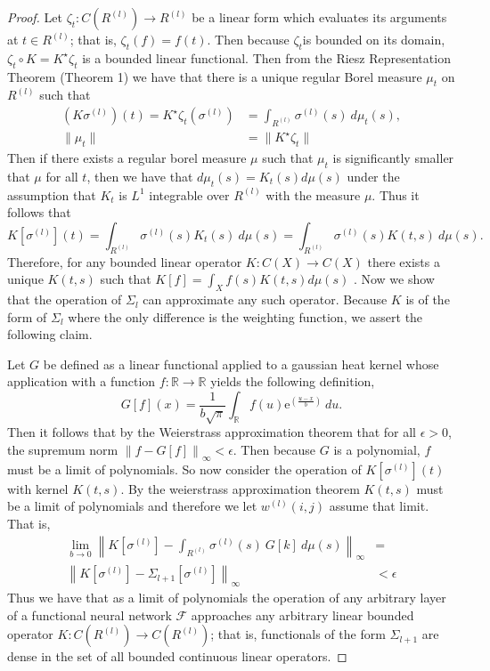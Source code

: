 \documentclass{ib-assignment}
\begin{document}
\begin{proof} Let $\zeta_t :C(R^{(l)})\to R^{(l)}$ be a linear form which evaluates its arguments at $t\in R^{(l)}$; that is, $\zeta_t(f) = f(t)$.  Then because $\zeta_t$is bounded on its domain, $\zeta_t\circ K = K^\star\zeta_t$ is a bounded linear functional. Then from the Riesz Representation Theorem (Theorem 1) we have that there is a unique regular Borel measure $\mu_t$ on $R^{(l)}$ such that 
\begin{equation*}
\begin{aligned}
    \left(K\sigma^{(l)}\right)(t) = K^\star \zeta_t\left(\sigma^{(l)}\right) &= \int_{R^{(l)}} \sigma^{(l)}(s)\ d\mu_t(s), \\
    \|\mu_t\| &= \|K^\star \zeta_t\| 
\end{aligned}
\end{equation*}
Then if there exists a regular borel measure $\mu$ such that $\mu_t$ is significantly smaller that $\mu$ for all $t$, then we have that $d\mu_t(s) = K_t(s)d\mu(s)$ under the assumption that $K_t$ is $L^1$ integrable over $R^{(l)}$ with the measure $\mu$. Thus it follows that 
\[
K\left[\sigma^{(l)}\right](t) = \int_{R^{(l)}} \sigma^{(l)}(s)K_t(s)\ d\mu(s) = \int_{R^{(l)}} \sigma^{(l)}(s)K(t,s)\  d\mu(s).
\]
Therefore, for any bounded linear operator $K:C(X)\to C(X)$ there exists a unique $K(t,s)$ such that $K[f] = \int_X f(s)K(t,s) d\mu(s)$ . Now we show that the operation of $\Sigma_l$ can approximate any such operator. Because $K$ is of the form of $\Sigma_l$ where the only difference is the weighting function, we assert the following claim.

Let $G$ be defined as a linear functional applied to a gaussian heat kernel whose application with a function $f:\mathbb{R} \to \mathbb{R}$ yields the following definition, $$G[f](x) = \frac1{b\sqrt{\pi}}\int_\mathbb{R} f(u)\mathrm{e}^{\left(\frac{u-x}b\right)}\ du.$$Then it follows that by the Weierstrass approximation theorem that for all $\epsilon > 0$, the supremum norm $\left\|f-G[f]\right\|_\infty < \epsilon$.   Then because $G$ is a polynomial, $f$ must be a limit of polynomials. So now consider the operation of $K\left[\sigma^{(l)}\right](t)$ with kernel  $K(t,s)$. By the weierstrass approximation theorem $K(t,s)$ must be a limit of polynomials and therefore we let $w^{(l)}(i,j)$ assume that limit. That is,
\begin{equation*}
\begin{aligned}
	\lim_{b \to 0}\left\|K\left[\sigma^{(l)}\right] -  \int_{R^{(l)}} \sigma^{(l)}(s)\ G[k]\  d\mu(s) \right\|_\infty &= \\
      \left\|K\left[\sigma^{(l)}\right] -  \Sigma_{l+1}\left[\sigma^{(l)}\right]  \right\|_\infty &< \epsilon
\end{aligned}
 \end{equation*}
 Thus we have that as a limit of polynomials the operation of any arbitrary layer of a functional neural network $\mathcal{F}$ approaches any arbitrary linear bounded operator $K:C(R^{(l)})\to C(R^{(l)})$; that is, functionals of the form $\Sigma_{l+1}$ are dense in the set of all bounded continuous linear operators.
\end{proof}


\newpage
{}
\printbibliography
\end{document}
